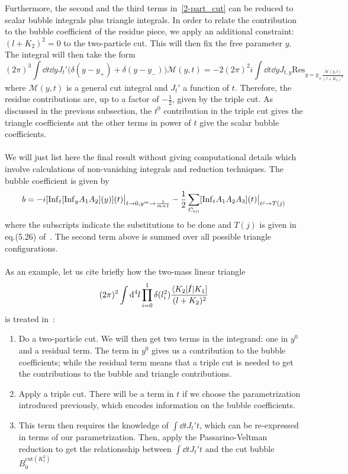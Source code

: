 Furthermore, the second and the third terms in~\cref{2-part_cut} can be reduced to scalar bubble integrals plus triangle integrals. 
In order to relate the contribution to the bubble coefficient of the residue piece, we apply an additional constraint: $(l+K_2)^2=0$ to the two-particle cut.
This will then fix the free parameter $y$.
The integral will then take the form
\begin{equation*}
(2\pi)^3\int \dd t \dd y J_t'\big(\delta(y-y_+) + \delta(y-y_-)\big) \mathcal{M}(y,t) = -2(2\pi)^2 i \int \dd t \dd y J_{t,y}\mathrm{Res}_{y = y_{\pm}\frac{\mathcal{M}(y,t)}{(l+K_2)^2}}
\end{equation*}
where $\mathcal{M}(y,t)$ is a general cut integral and $J_t'$ a function of $t$.
Therefore, the residue contributions are, up to a factor of $-\frac{1}{2}$, given by the triple cut.
As discussed in the previous subsection, the $t^0$ contribution in the triple cut gives the triangle coefficients ant the other terms in power of $t$ give the scalar bubble coefficients.
\\\\
We will just list here the final result without giving computational details which involve calculations of non-vanishing integrals and reduction techniques.
The bubble coefficient is given by
\begin{equation*}
b = -i[\mathrm{Inf}_t[\mathrm{Inf}_y A_1 A_2](y)](t)\big|_{t\rightarrow 0 , y^m\rightarrow \frac{1}{m+1}}
-\frac{1}{2}\sum_{C_{\mathrm{tri}}}[\mathrm{Inf}_t A_1A_2A_3](t)\big|_{t^j\rightarrow T(j)}
\end{equation*}
where the subscripts indicate the substitutions to be done and $T(j)$ is given in eq.(5.26) of~\cite{Forde:2007mi}. 
The second term above is summed over all possible triangle configurations.
\\\\
As an example, let us cite briefly how the two-mass linear triangle
\begin{equation*}
(2\pi)^2\int\textrm{d}^4 l \prod_{i=0}^1\delta(l_i^2)\frac{\langle K_2|\slashed{l}|K_1]}{(l+K_2)^2}
\end{equation*}
is treated in~\cite{Forde:2007mi}:
\begin{enumerate}
\item Do a two-particle cut. We will then get two terms in the integrand: one in $y^0$ and a residual term. The term in $y^0$ gives us a contribution to the bubble coefficients; while the residual term means that a triple cut is needed to get the contributions to the bubble and triangle contributions.
%
\item Apply a triple cut. There will be a term in $t$ if we choose the parametrization introduced previously, which encodes information on the bubble coefficients.
%
\item This term then requires the knowledge of $\int \dd t J_t' t$, which can be re-expressed in terms of our parametrization. Then, apply the Passarino-Veltman reduction to get the relationsship between $\int \dd tJ_t' t$ and the cut bubble $B_0^{\mathrm{cut}(K_1^2)}$
\end{enumerate}
%
%
%
